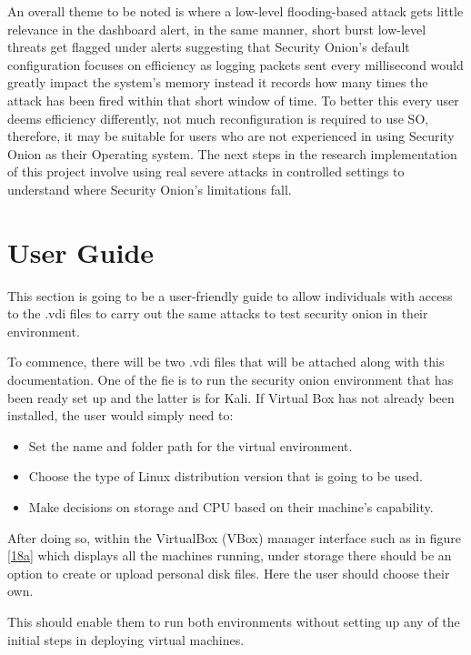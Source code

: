 \documentclass[12pt]{article}
\begin{document}
An overall theme to be noted is where a low-level flooding-based attack gets little relevance in the dashboard alert, in the same manner, short burst low-level threats get flagged under alerts suggesting that Security Onion's default configuration focuses on efficiency as logging packets sent every millisecond would greatly impact the system's memory instead it records how many times the attack has been fired within that short window of time. To better this every user deems efficiency differently, not much reconfiguration is required to use SO, therefore, it may be suitable for users who are not experienced in using Security Onion as their Operating system. The next steps in the research implementation of this project involve using real severe attacks in controlled settings to understand where Security Onion's limitations fall.




\section{User Guide} \label{userguide}
This section is going to be a user-friendly guide to allow individuals with access to the .vdi files to carry out the same attacks to test security onion in their environment.

To commence, there will be two .vdi files that will be attached along with this documentation. One of the fie is to run the security onion environment that has been ready set up and the latter is for Kali. If Virtual Box has not already been installed, the user would simply need to:
\begin{itemize}
\item Set the name and folder path for the virtual environment.
\item Choose the type of Linux distribution version that is going to be used.
\item Make decisions on storage and CPU  based on their machine's capability.
\end{itemize} 
After doing so, within the VirtualBox (VBox) manager interface such as in figure \ref{18a} which displays all the machines running, under storage there should be an option to create or upload personal disk files. 
Here the user should choose their own.

This should enable them to run both environments without setting up any of the initial steps in deploying virtual machines.
\end{document}
